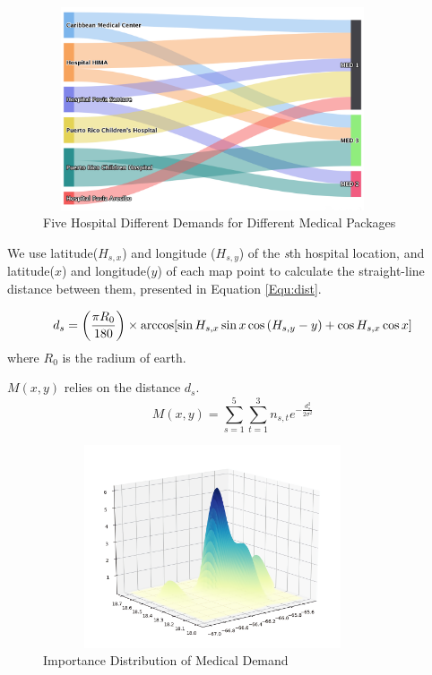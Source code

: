 \documentclass{mcmthesis}
\begin{document}
\begin{figure}[htbp]
    \centering
    \includegraphics[height=6cm,width=10cm]{figures/hospitalchart.png}
    \caption{Five Hospital Different Demands for Different Medical Packages}
    \label{Fig:hosp}
\end{figure}

We use latitude($H_{s,x}$) and longitude ($H_{s,y}$) of the \emph{s}th hospital location, and latitude($x$) and longitude($y$) of each map point to calculate the straight-line distance between them, presented in Equation \eqref{Equ:dist}.

\begin{equation}\label{Equ:dist}
       d_s = \left(\frac{\pi R_0}{180} \right)\times \mathrm{arccos}[\sin{H_{s,x}}\sin{x}\cos{(H_{s,y}-y)}+\cos{H_{s,x}}\cos{x}]\\
\end{equation}
where $R_0$ is the radium of earth.

$M(x,y)$ relies on the distance $d_s$.
\begin{equation}\label{Equ:medi}
    M(x,y) = \sum_{s=1}^5 \sum_{t=1}^3 n_{s,t} e^{-\frac{d_s^2}{2\sigma^{2}}}
\end{equation}

\begin{figure}[htbp]
    \centering
    \includegraphics[height=6cm,width=10cm]{figures/importance.png}
    \caption{Importance Distribution of Medical Demand}
    \label{Fig:impo}
\end{figure}
\end{document}
